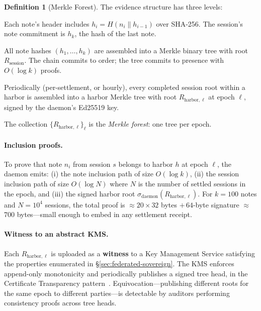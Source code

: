 \documentclass[11pt,a4paper]{article}
\theoremstyle{definition}
\newtheorem{definition}{Definition}[section]
\theoremstyle{remark}
\begin{document}
\begin{definition}[Merkle Forest]\label{def:merkle-forest}
The evidence structure has three levels:
\begin{description}[nosep]
  \item[Note chain.] Each note's header includes $h_i = H(n_i \mathbin{\|} h_{i-1})$ over SHA-256. The session's note commitment is $h_k$, the hash of the last note.
  \item[Session root.] All note hashes $(h_1,\ldots,h_k)$ are assembled into a Merkle binary tree with root $R_{\text{session}}$. The chain commits to order; the tree commits to presence with $O(\log k)$ proofs.
  \item[Harbor root.] Periodically (per-settlement, or hourly), every completed session root within a harbor is assembled into a harbor Merkle tree with root $R_{\text{harbor},\ell}$ at epoch $\ell$, signed by the daemon's Ed25519 key.
\end{description}
The collection $\{R_{\text{harbor},\ell}\}_{\ell}$ is the \emph{Merkle forest}: one tree per epoch.
\end{definition}

\paragraph{Inclusion proofs.} To prove that note $n_i$ from session $s$ belongs to harbor $h$ at epoch $\ell$, the daemon emits: (i) the note inclusion path of size $O(\log k)$, (ii) the session inclusion path of size $O(\log N)$ where $N$ is the number of settled sessions in the epoch, and (iii) the signed harbor root $\sigma_{\text{daemon}}(R_{\text{harbor},\ell})$. For $k=100$ notes and $N=10^{4}$ sessions, the total proof is $\approx 20 \times 32$ bytes $+\,64$-byte signature $\approx$ 700 bytes---small enough to embed in any settlement receipt.

\paragraph{Witness to an abstract KMS.} Each $R_{\text{harbor},\ell}$ is uploaded as a \textbf{witness} to a Key Management Service satisfying the properties enumerated in \S\ref{sec:federated-sovereign}. The KMS enforces append-only monotonicity and periodically publishes a signed tree head, in the Certificate Transparency pattern~\cite{laurie2013ct}. Equivocation---publishing different roots for the same epoch to different parties---is detectable by auditors performing consistency proofs across tree heads.
\end{document}
